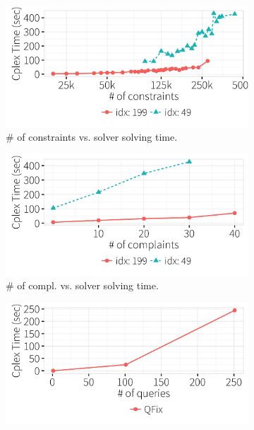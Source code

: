   
  \begin{figure}[t]
  \centering
      \begin{subfigure} [t]{.3\textwidth}
    \includegraphics[width = .99\columnwidth]{figures/num_cons_time}
    \vspace*{-.25in}
    \caption{\# of constraints vs. solver solving time.}
    \vspace*{-.1in}
    \label{f:heuristic_time} 
    \end{subfigure}
    \begin{subfigure} [t]{.3\textwidth}
    \includegraphics[width = .99\columnwidth]{figures/num_compl_time}
    \vspace*{-.25in}
    \caption{\# of compl. vs. solver solving time.}
    \vspace*{-.1in}
    \label{f:heuristic_acc} 
    \end{subfigure}
    \begin{subfigure} [t]{.3\textwidth}
    \includegraphics[width = .99\columnwidth]{figures/num_queries_time}

\end{subfigure}
\end{figure}
